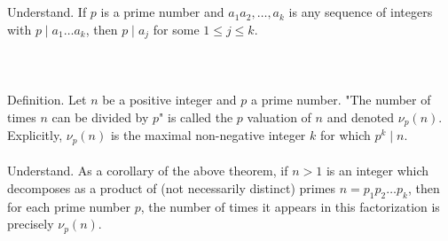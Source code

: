 \documentclass[english]{article}
\newcommand\cyan[1]{{\color{blue}{#1}}}
\begin{document}
\\\\
Understand. If $p$ is a prime number and $a_1a_2,\dots,a_k$ is any sequence of integers with $p\mid a_1\dots a_k$, then $p\mid a_j$ for some $1\le j\le k$.
\\\\
\cyan{The reason $2$ appears exactly $3$ times in the prime factorization $24=2\cdot2\cdot2\cdot3$ is because we can divide $24$ by $2$ three times, but no more. Namely, $24/2=12$, $12/2=6$, $6/2=3$, and $3$ cannot be divided by $2$. More generally, we define}
\\\\
Definition. Let $n$ be a positive integer and $p$ a prime number. "The number of times $n$ can be divided by $p$" is called the $p$ valuation of $n$ and denoted $\nu_p(n)$. Explicitly, $\nu_p(n)$ is the maximal non-negative integer $k$ for which $p^k\mid n$.
\\\\
Understand. As a corollary of the above theorem, if $n>1$ is an integer which decomposes as a product of (not necessarily distinct) primes $n=p_1p_2\dots p_k$, then for each prime number $p$, the number of times it appears in this factorization is precisely $\nu_p(n)$.
\end{document}
